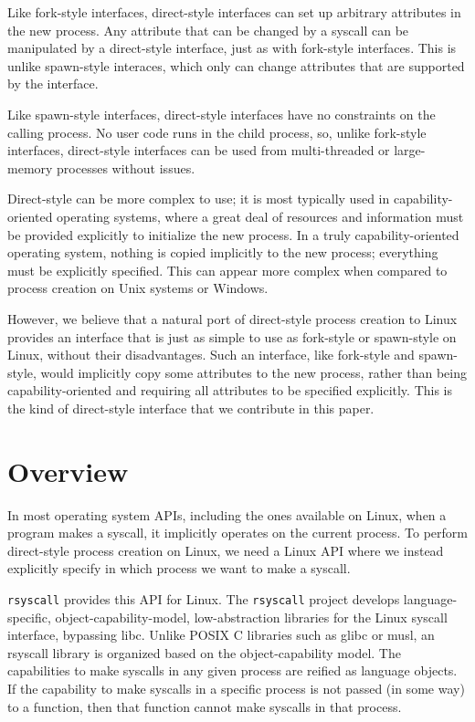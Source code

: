 \documentclass[sigplan]{acmart}
\begin{document}
Like fork-style interfaces,
direct-style interfaces can set up arbitrary attributes in the new process.
Any attribute that can be changed by a syscall
can be manipulated by a direct-style interface,
just as with fork-style interfaces.
This is unlike spawn-style interaces,
which only can change attributes that are supported by the interface.

Like spawn-style interfaces,
direct-style interfaces have no constraints on the calling process.
No user code runs in the child process,
so, unlike fork-style interfaces,
direct-style interfaces can be used from multi-threaded or large-memory processes without issues.

Direct-style can be more complex to use;
it is most typically used in capability-oriented operating systems,
where a great deal of resources and information must be provided explicitly to initialize the new process.
In a truly capability-oriented operating system,
nothing is copied implicitly to the new process;
everything must be explicitly specified.
This can appear more complex
when compared to process creation on Unix systems or Windows.

However, we believe that a natural port of direct-style process creation to Linux
provides an interface that is just as simple to use as fork-style or spawn-style on Linux,
without their disadvantages.
Such an interface, like fork-style and spawn-style,
would implicitly copy some attributes to the new process,
rather than being capability-oriented and requiring all attributes to be specified explicitly.
This is the kind of direct-style interface that we contribute in this paper.

\section{Overview}\label{overview}
In most operating system APIs, including the ones available on Linux,
when a program makes a syscall, it implicitly operates on the current process.
To perform direct-style process creation on Linux,
we need a Linux API where we instead explicitly specify in which process we want to make a syscall.

\texttt{rsyscall} provides this API for Linux.
The \texttt{rsyscall} project develops
language-specific, object-capability-model, low-abstraction libraries for the Linux syscall interface,
bypassing libc.
Unlike POSIX C libraries such as glibc or musl,
an rsyscall library is organized based on the object-capability model.
The capabilities to make syscalls in any given process are reified as language objects.
If the capability to make syscalls in a specific process is not passed (in some way) to a function,
then that function cannot make syscalls in that process.
\end{document}
